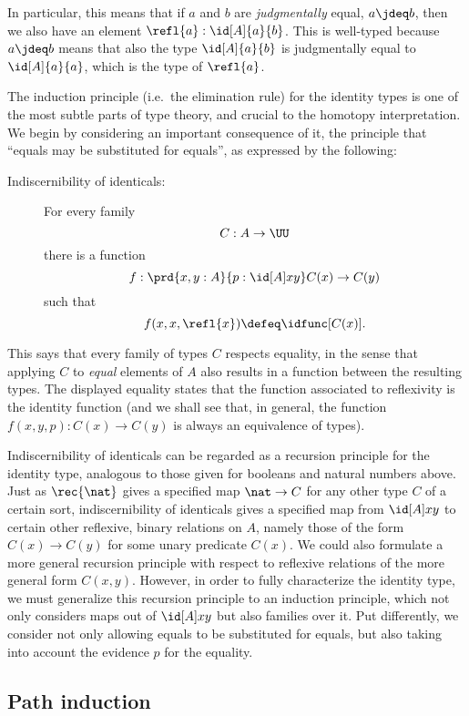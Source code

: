 In particular, this means that if $a$ and $b$ are \emph{judgmentally} equal, $a\jdeq b$, then we also have an element $\refl{a} : \id[A]{a}{b}$.
This is well-typed because $a\jdeq b$ means that also the type $\id[A]{a}{b}$ is judgmentally equal to $\id[A]{a}{a}$, which is the type of $\refl{a}$.

The induction principle (i.e.\ the elimination rule) for the identity types is one of the most subtle parts of type theory, and crucial to the homotopy interpretation.
We begin by considering an important consequence of it, the principle that ``equals may be substituted for equals'', as expressed by the following:
%
%
\begin{description}
\item[Indiscernibility of identicals:]
For every family 
\[
C : A \to \UU
\]
there is a function
\[
f : \prd{x,y:A}{p:\id[A] x y} C(x) \to C(y)
\]
such that
\[
f(x,x,\refl{x}) \defeq \idfunc[C(x)].
\]
\end{description}
This says that every family of types $C$ respects equality, in the sense that applying $C$ to \emph{equal} elements of $A$ also results in a function between the resulting types. The displayed equality states that the function associated to reflexivity is the identity function (and we shall see that, in general, the function $f(x,y,p): C(x) \to C(y)$ is always an equivalence of types).

Indiscernibility of identicals can be regarded as a recursion principle for the identity type, analogous to those given for booleans and natural numbers above.
Just as $\rec{\nat}$ gives a specified map $\nat\to C$ for any other type $C$ of a certain sort, indiscernibility of identicals gives a specified map from $\id[A] x y$ to certain other reflexive, binary relations on $A$, namely those of the form $C(x) \to C(y)$ for some unary predicate $C(x)$.
We could also formulate a more general recursion principle with respect to reflexive relations of the more general form $C(x,y)$.
However, in order to fully characterize the identity type, we must generalize this recursion principle to an induction principle, which not only considers maps out of $\id[A] x y$ but also families over it.
Put differently, we consider not only allowing equals to be substituted for equals, but also taking into account the evidence $p$ for the equality.
    
\subsection{Path induction}

